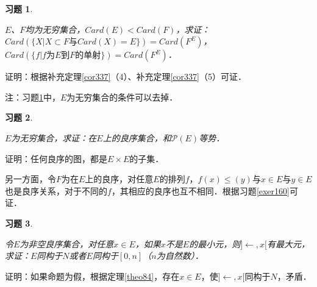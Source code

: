 \documentclass[12pt, a4paper, oneside]{book}
\newtheorem{exer}{习题}
\begin{document}
			\begin{exer}\label{exer162}
				\hfill\par
				$E$、$F$均为无穷集合，$Card(E)<Card(F)$，求证：$Card(\{X|X\subset F\text{与}Card(X)=E\})=Card(F^E)$，$Card(\{f|f\text{为}E\text{到}F\text{的单射}\})=Card(F^E)$．
			\end{exer}
			证明：根据补充定理\ref{cor337}（4）、补充定理\ref{cor337}（5）可证．
			\par
			注：习题\ref{exer162}中，$E$为无穷集合的条件可以去掉．
			
			\begin{exer}\label{exer163}
				\hfill\par
				$E$为无穷集合，求证：在$E$上的良序集合，和$\mathcal{P}(E)$等势．
			\end{exer}
			证明：任何良序的图，都是$E\times E$的子集．
			\par
			另一方面，令$F$为在$E$上的良序，对任意$E$的排列$f$，$f(x)\leq (y)\text{与}x\in E\text{与}y\in E$也是良序关系，对于不同的$f$，其相应的良序也互不相同．根据习题\ref{exer160}可证．
			
			\begin{exer}\label{exer164}
				\hfill\par
				令$E$为非空良序集合，对任意$x\in E$，如果$x$不是$E$的最小元，则$]\gets, x[$有最大元，求证：$E$同构于$N$或者$E$同构于$[0, n]$（$n$为自然数）．
			\end{exer}
			证明：如果命题为假，根据定理\ref{theo84}，存在$x\in E$，使$]\gets, x[$同构于$N$，矛盾．			
			
\end{document}

